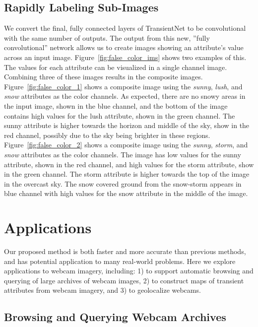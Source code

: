 \documentclass[10pt,twocolumn,letterpaper]{article}
\newcommand{\figref}[1]{Figure~\ref{fig:#1}}
\begin{document}
\subsection{Rapidly Labeling Sub-Images}

We convert the final, fully connected layers of TransientNet to be
convolutional with the same number of outputs.  The output from this new,
''fully convolutional'' network allows us to create images showing an
attribute's value across an input image.  \figref{false_color_ims} shows two
examples of this.  The values for each attribute can be visualized in a single
channel image.  Combining three of these images results in the composite
images.  \figref{false_color_1} shows a composite image using the
\textit{sunny}, \textit{lush}, and \textit{snow} attributes as the color
channels.  As expected, there are no snowy areas in the input image, shown in
the blue channel, and the bottom of the image contains high values for the lush
attribute, shown in the green channel.  The sunny attribute is higher towards
the horizon and middle of the sky, show in the red channel, possibly due to the
sky being brighter in these regions.  \figref{false_color_2} shows a composite
image using the \textit{sunny}, \textit{storm}, and \textit{snow} attributes as
the color channels.  The image has low values for the sunny attribute, shown in
the red channel, and high values for the storm attribute, show in the green
channel.  The storm attribute is higher towards the top of the image in the
overcast sky.  The snow covered ground from the snow-storm appears in blue
channel with high values for the snow attribute in the middle of the image.


\section{Applications}

Our proposed method is both faster and more accurate than previous
methods, and has potential application to many real-world problems.
Here we explore applications to webcam imagery,
including: 1) to support automatic browsing and querying of large
archives of webcam images, 2) to construct maps of transient
attributes from webcam imagery, and 3) to geolocalize webcams.

\subsection{Browsing and Querying Webcam Archives}
\end{document}
